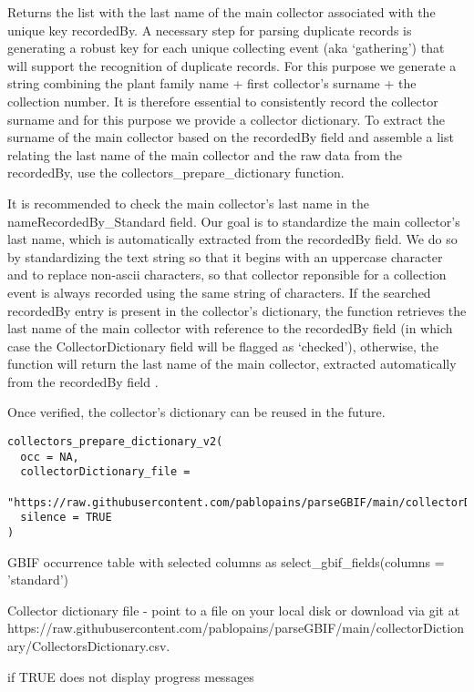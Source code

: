 \documentclass[a4paper]{book}
\begin{document}
%
\begin{Description}
Returns the list with the last name of the main collector associated with the unique key recordedBy.
A necessary step for parsing duplicate records is generating a robust key for each unique collecting event
(aka ‘gathering’) that will support the recognition of duplicate records. For this purpose we generate a string
combining the plant family name +  first collector’s surname +  the collection number.
It is therefore essential to consistently record the collector surname and for this purpose we provide a collector
dictionary. To extract the surname of the main collector based on the recordedBy field and assemble a list relating
the last name of the main collector and the raw data from the recordedBy, use the collectors\_prepare\_dictionary function.

It is recommended to check the main collector’s last name in the nameRecordedBy\_Standard field.
Our goal is to standardize the main collector’s last name, which is automatically extracted from the recordedBy field.
We do so by standardizing the text string so that it begins with an uppercase character and to replace non-ascii
characters, so that collector reponsible for a collection event is always recorded using  the same string of characters.
If the searched recordedBy entry is present in the collector’s dictionary, the function retrieves the last name
of the main collector with reference to the recordedBy field (in which case the CollectorDictionary field will be
flagged as ‘checked’), otherwise, the function will return the last name of the main collector, extracted
automatically from the recordedBy field .

Once verified, the collector’s dictionary can be reused in the future.
\end{Description}
%
\begin{Usage}
\begin{verbatim}
collectors_prepare_dictionary_v2(
  occ = NA,
  collectorDictionary_file =
    "https://raw.githubusercontent.com/pablopains/parseGBIF/main/collectorDictionary/CollectorsDictionary.csv",
  silence = TRUE
)
\end{verbatim}
\end{Usage}
%
\begin{Arguments}
\begin{ldescription}
\item[\code{occ}] GBIF occurrence table with selected columns as select\_gbif\_fields(columns = 'standard')

\item[\code{collectorDictionary\_file}] Collector dictionary file - point to a file on your local disk or download via git at https://raw.githubusercontent.com/pablopains/parseGBIF/main/collectorDictionary/CollectorsDictionary.csv.

\item[\code{silence}] if TRUE does not display progress messages
\end{ldescription}
\end{Arguments}
\end{document}
